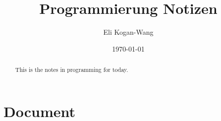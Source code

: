 \documentclass[a4paper,12pt]{article}
\title{Programmierung Notizen}
\author{Eli Kogan-Wang}
\date{\today}
\begin{document}
\renewcommand{\abstractname}{Abstract}
\begin{abstract}
  This is the notes in programming for today.
\end{abstract}
\section{Document}
\end{document}
